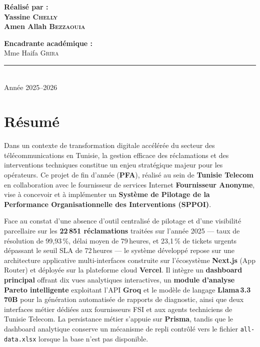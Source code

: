 \documentclass[10pt,a4paper]{report}
\begin{document}
\begin{titlepage}
\vfill

\begin{minipage}[t]{0.48\textwidth}
\raggedright
{\small\bfseries\color{ttgray}Réalisé par :}\\[6pt]
{\normalsize\bfseries Yassine \textsc{Chelly}}\\
{\normalsize\bfseries Amen Allah \textsc{Bezzaouia}}
\end{minipage}
\hfill
\begin{minipage}[t]{0.48\textwidth}
\raggedleft
{\small\bfseries\color{ttgray}Encadrante académique :}\\[6pt]
{\normalsize Mme Haifa \textsc{Grira}}
\end{minipage}

\vspace{1.2cm}
{\color{ttbluel}\rule{\linewidth}{1pt}}\\[0.2cm]
{\normalsize\color{ttgray}Année 2025--2026}

\end{titlepage}

\chapter*{Résumé}
\thispagestyle{fancy}

Dans un contexte de transformation digitale accélérée du secteur des télécommunications en Tunisie, la gestion efficace des réclamations et des interventions techniques constitue un enjeu stratégique majeur pour les opérateurs. Ce projet de fin d'année (\textbf{PFA}), réalisé au sein de \textbf{Tunisie Telecom} en collaboration avec le fournisseur de services Internet \textbf{Fournisseur Anonyme}, vise à concevoir et à implémenter un \textbf{Système de Pilotage de la Performance Organisationnelle des Interventions (SPPOI)}.

Face au constat d'une absence d'outil centralisé de pilotage et d'une visibilité parcellaire sur les \textbf{22\,851 réclamations} traitées sur l'année 2025 --- taux de résolution de 99,93\,\%, délai moyen de 79\,heures, et 23,1\,\% de tickets urgents dépassant le seuil SLA de 72\,heures --- le système développé repose sur une architecture applicative multi-interfaces construite sur l'écosystème \textbf{Next.js} (App Router) et déployée sur la plateforme cloud \textbf{Vercel}. Il intègre un \textbf{dashboard principal} offrant dix vues analytiques interactives, un \textbf{module d'analyse Pareto intelligente} exploitant l'API \textbf{Groq} et le modèle de langage \textbf{Llama\,3.3\,70B} pour la génération automatisée de rapports de diagnostic, ainsi que deux interfaces métier dédiées aux fournisseurs FSI et aux agents techniciens de Tunisie Telecom. La persistance métier s'appuie sur \textbf{Prisma}, tandis que le dashboard analytique conserve un mécanisme de repli contrôlé vers le fichier \texttt{all-data.xlsx} lorsque la base n'est pas disponible.
\end{document}
